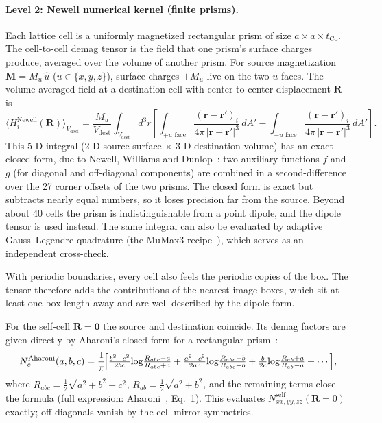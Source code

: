 \documentclass[11pt,a4paper]{article}
\newcommand{\mb}[1]{\mathbf{#1}}
\newcommand{\tCo}{t_{\text{Co}}}
\begin{document}
\paragraph{Level 2: Newell numerical kernel (finite prisms).}
Each lattice cell is a uniformly magnetized rectangular prism of
size $a\times a \times \tCo$.  The cell-to-cell demag tensor is the
field that one prism's surface charges produce, averaged over the
volume of another prism.
For source magnetization $\mb{M} = M_u\,\hat{u}$ ($u \in\{x,y,z\}$),
surface charges $\pm M_u$ live on the two $u$-faces.  The
volume-averaged field at a destination cell with center-to-center
displacement $\mb{R}$ is
%
\begin{equation}
\bigl\langle H_i^{\text{Newell}}(\mb{R})\bigr\rangle_{V_{\text{dest}}}
= \frac{M_u}{V_{\text{dest}}}\!\!
  \int_{V_{\text{dest}}}\!\!\!\!d^3 r
  \left[
    \int_{+u\text{ face}}\!\!\!\!\!\frac{(\mb{r} - \mb{r}')_i}
                                          {4\pi\,|\mb{r}-\mb{r}'|^3}\,
                           dA'
   -\int_{-u\text{ face}}\!\!\!\!\!\frac{(\mb{r} - \mb{r}')_i}
                                          {4\pi\,|\mb{r}-\mb{r}'|^3}\,
                           dA'
  \right].
\label{eq:newell_integral}
\end{equation}
%
This 5-D integral (2-D source surface $\times$ 3-D destination
volume) has an exact closed form, due to Newell, Williams and
Dunlop~\cite{newell1993}: two auxiliary functions $f$ and $g$
(for diagonal and off-diagonal components) are combined in a
second-difference over the 27 corner offsets of the two prisms.
The closed form is exact but subtracts nearly equal numbers, so it
loses precision far from the source.  Beyond about 40 cells the
prism is indistinguishable from a point dipole, and the dipole
tensor is used instead.  The same integral can also be evaluated by
adaptive Gauss--Legendre quadrature (the MuMax3
recipe~\cite{mumax3}), which serves as an independent cross-check.

With periodic boundaries, every cell also feels the periodic copies
of the box.  The tensor therefore adds the contributions of the
nearest image boxes, which sit at least one box length away and are
well described by the dipole form.

For the self-cell $\mb{R} = \mb{0}$ the source and destination
coincide.  Its demag factors are given directly by Aharoni's closed
form for a rectangular prism~\cite{aharoni1998}:
%
\begin{equation}
N_c^{\text{Aharoni}}(a, b, c)
= \frac{1}{\pi}\!\Bigl[
    \tfrac{b^2 - c^2}{2bc}\!
       \log\!\tfrac{R_{abc} - a}{R_{abc} + a}
    + \tfrac{a^2 - c^2}{2ac}\!
       \log\!\tfrac{R_{abc} - b}{R_{abc} + b}
    + \tfrac{b}{2c}\!
       \log\!\tfrac{R_{ab} + a}{R_{ab} - a}
    + \cdots
  \Bigr],
\end{equation}
%
where $R_{abc} = \tfrac12\sqrt{a^2 + b^2 + c^2}$,
$R_{ab} = \tfrac12\sqrt{a^2 + b^2}$, and the remaining terms close
the formula (full expression: Aharoni~\cite{aharoni1998}, Eq.~1).
This evaluates $N^{\text{self}}_{xx, yy, zz}(\mb{R}=0)$ exactly;
off-diagonals vanish by the cell mirror symmetries.
\end{document}
